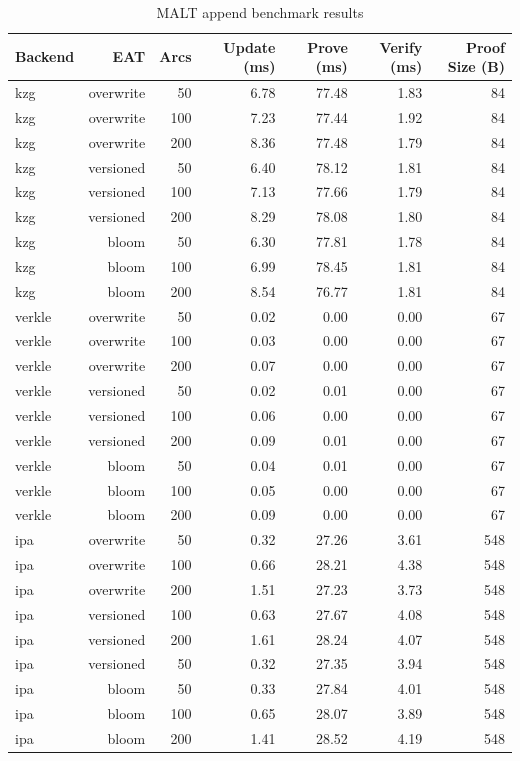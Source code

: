\begin{table}[htbp]
\centering
\caption{MALT append benchmark results}
\label{tab:append}
\begin{tabular}{lrrrrrr}
\toprule
Backend & EAT & Arcs & Update (ms) & Prove (ms) & Verify (ms) & Proof Size (B) \\
\midrule
kzg & overwrite & 50 & 6.78 & 77.48 & 1.83 & 84 \\
kzg & overwrite & 100 & 7.23 & 77.44 & 1.92 & 84 \\
kzg & overwrite & 200 & 8.36 & 77.48 & 1.79 & 84 \\
kzg & versioned & 50 & 6.40 & 78.12 & 1.81 & 84 \\
kzg & versioned & 100 & 7.13 & 77.66 & 1.79 & 84 \\
kzg & versioned & 200 & 8.29 & 78.08 & 1.80 & 84 \\
kzg & bloom & 50 & 6.30 & 77.81 & 1.78 & 84 \\
kzg & bloom & 100 & 6.99 & 78.45 & 1.81 & 84 \\
kzg & bloom & 200 & 8.54 & 76.77 & 1.81 & 84 \\
verkle & overwrite & 50 & 0.02 & 0.00 & 0.00 & 67 \\
verkle & overwrite & 100 & 0.03 & 0.00 & 0.00 & 67 \\
verkle & overwrite & 200 & 0.07 & 0.00 & 0.00 & 67 \\
verkle & versioned & 50 & 0.02 & 0.01 & 0.00 & 67 \\
verkle & versioned & 100 & 0.06 & 0.00 & 0.00 & 67 \\
verkle & versioned & 200 & 0.09 & 0.01 & 0.00 & 67 \\
verkle & bloom & 50 & 0.04 & 0.01 & 0.00 & 67 \\
verkle & bloom & 100 & 0.05 & 0.00 & 0.00 & 67 \\
verkle & bloom & 200 & 0.09 & 0.00 & 0.00 & 67 \\
ipa & overwrite & 50 & 0.32 & 27.26 & 3.61 & 548 \\
ipa & overwrite & 100 & 0.66 & 28.21 & 4.38 & 548 \\
ipa & overwrite & 200 & 1.51 & 27.23 & 3.73 & 548 \\
ipa & versioned & 100 & 0.63 & 27.67 & 4.08 & 548 \\
ipa & versioned & 200 & 1.61 & 28.24 & 4.07 & 548 \\
ipa & versioned & 50 & 0.32 & 27.35 & 3.94 & 548 \\
ipa & bloom & 50 & 0.33 & 27.84 & 4.01 & 548 \\
ipa & bloom & 100 & 0.65 & 28.07 & 3.89 & 548 \\
ipa & bloom & 200 & 1.41 & 28.52 & 4.19 & 548 \\
\bottomrule
\end{tabular}
\end{table}
